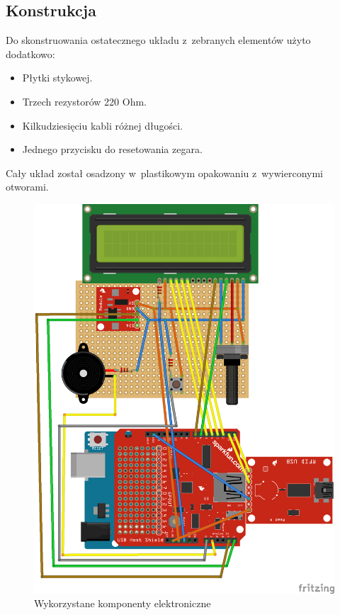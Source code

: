 \documentclass[declaration,shortabstract, mgr]{iithesis}
\begin{document}
\subsection{Konstrukcja}
\indent Do skonstruowania ostatecznego układu z~zebranych elementów użyto dodatkowo:
\begin{itemize}
\item Płytki stykowej.
\item Trzech rezystorów 220 Ohm.
\item Kilkudziesięciu kabli różnej długości.
\item Jednego przycisku do resetowania zegara.
\end{itemize}
\indent Cały układ został osadzony w~plastikowym opakowaniu z~wywierconymi otworami.\\
\begin{figure}[h]
\caption{Wykorzystane komponenty elektroniczne}
\centering
\includegraphics{circuit.png}
\end{figure}
\end{document}
